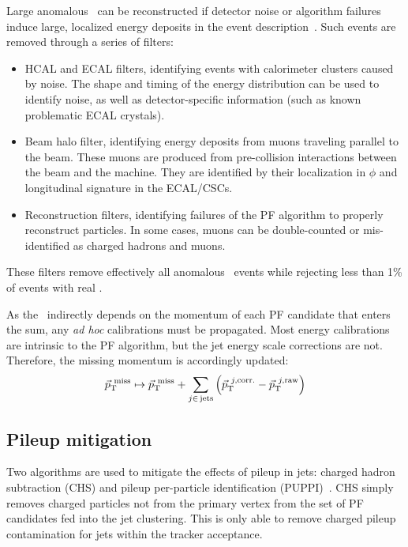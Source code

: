 Large anomalous \ptmiss~can be reconstructed if detector noise or algorithm failures induce large, localized energy deposits in the event description~\cite{cmsmet}.
Such events are removed through a series of filters:
\begin{itemize}
    \item HCAL and ECAL filters, identifying events with calorimeter clusters caused by noise. 
            The shape and timing of the energy distribution can be used to identify noise, as well as detector-specific information (such as known problematic ECAL crystals).
    \item Beam halo filter, identifying energy deposits from muons traveling parallel to the beam. 
          These muons are produced from pre-collision interactions between the beam and the machine.
          They are identified by their localization in $\phi$ and longitudinal signature in the ECAL/CSCs.
    \item Reconstruction filters, identifying failures of the PF algorithm to properly reconstruct particles.
          In some cases, muons can be double-counted or mis-identified as charged hadrons and muons.
\end{itemize}
These filters remove effectively all anomalous \ptmiss~events while rejecting less than 1\% of events with real \ptmiss. 

As the \ptmiss~indirectly depends on the momentum of each PF candidate that enters the sum, any \emph{ad hoc} calibrations must be propagated.
Most energy calibrations are intrinsic to the PF algorithm, but the jet energy scale corrections are not.
Therefore, the missing momentum is accordingly updated:
\begin{equation}
    \vec{p}_\mathrm{T}^{~\mathrm{miss}} \mapsto \vec{p}_\mathrm{T}^{~\mathrm{miss}}  + \sum_{j\in\,\mathrm{jets}} \left(\vec{p}_\mathrm{T}^{~j,\mathrm{corr.}} - \vec{p}_\mathrm{T}^{~j,\mathrm{raw}}\right) 
\end{equation}

\subsection{Pileup mitigation}

Two algorithms are used to mitigate the effects of pileup in jets: charged hadron subtraction (CHS) and pileup per-particle identification (PUPPI)~\cite{puppi}.
CHS simply removes charged particles not from the primary vertex from the set of PF candidates fed into the jet clustering.
This is only able to remove charged pileup contamination for jets within the tracker acceptance.


